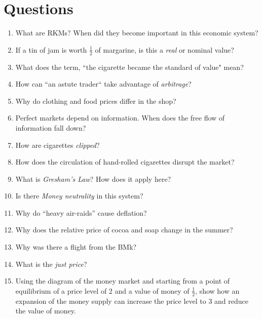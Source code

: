 \documentclass{article}
\begin{document}
\section{Questions}
\begin{enumerate}
\item What are RKMs? When did they become important in this economic system? 

\item If a tin of jam is worth $\frac{1}{2}$ of margarine, is this a \emph{real} or {nominal} value? 

\item What does the term, ``the cigarette became the standard of value" mean? 

\item How can ``an astute trader`` take advantage of \emph{arbitrage}? 

\item Why do clothing and food prices differ in the shop? 

\item Perfect markets depend on information. When does the free flow of information fall down? 

\item How are cigarettes \emph{clipped}?

\item How does the circulation of hand-rolled cigarettes disrupt the market? 

\item What is \emph{Gresham's Law}?  How does it apply here? 

\item Is there \emph{Money neutrality} in this system? 

\item Why do ``heavy air-raids'' cause deflation? 

\item Why does the relative price of cocoa and soap change in the summer? 

\item Why was there a flight from the BMk?

\item What is the \emph{just price}?

\item Using the diagram of the money market and starting from a point of equilibrium of a price level of 2 and a value of money of $\frac{1}{2}$, show how an expansion of the money supply can increase the price level to 3 and reduce the value of money. 


\end{enumerate}
\end{document}
